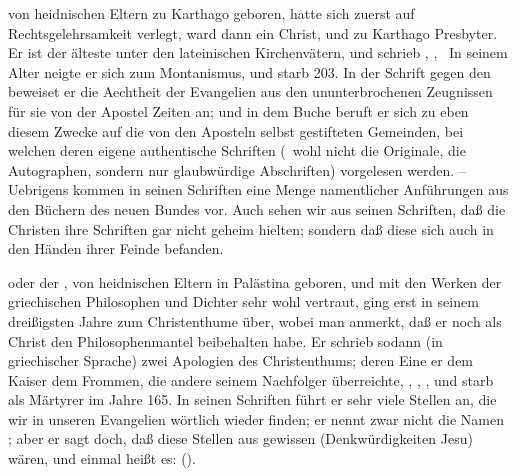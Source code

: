 \begin{aufza}
\item {} von heidnischen Eltern zu Karthago geboren, hatte sich zuerst auf Rechtsgelehrsamkeit verlegt, ward dann ein Christ, und zu Karthago Presbyter. Er ist der älteste unter den lateinischen Kirchenvätern, und schrieb , , \umA\  In seinem Alter neigte er sich zum Montanismus, und starb 203. In der Schrift gegen den  beweiset er die Aechtheit der Evangelien aus den ununterbrochenen Zeugnissen für sie von der Apostel Zeiten an; und in dem Buche  beruft er sich zu eben diesem Zwecke auf die von den Aposteln selbst gestifteten Gemeinden, bei welchen deren eigene authentische Schriften (\dh\ wohl nicht die Originale, die Autographen, sondern nur glaubwürdige Abschriften) vorgelesen werden. -- Uebrigens kommen in seinen Schriften eine Menge namentlicher Anführungen aus den Büchern des neuen Bundes vor. Auch sehen wir aus seinen Schriften, daß die Christen ihre Schriften gar nicht geheim hielten; sondern daß diese sich auch in den Händen ihrer Feinde befanden.
\item {} oder der , von heidnischen Eltern in Palästina geboren, und mit den Werken der griechischen Philosophen und Dichter sehr wohl vertraut, ging erst in seinem dreißigsten Jahre zum Christenthume über, wobei man anmerkt, daß er noch als Christ den Philosophenmantel beibehalten habe. Er schrieb sodann (in griechischer Sprache) zwei Apologien des Christenthums; deren Eine er dem Kaiser  dem Frommen, die andere seinem Nachfolger überreichte, , , \umA , und starb als Märtyrer im Jahre 165. In seinen Schriften führt er sehr viele Stellen an, die wir in unseren Evangelien wörtlich wieder finden; er nennt zwar nicht die Namen ; aber er sagt doch, daß diese Stellen aus gewissen  (Denkwürdigkeiten Jesu) wären, und einmal heißt es:  ().%
\end{aufza}

